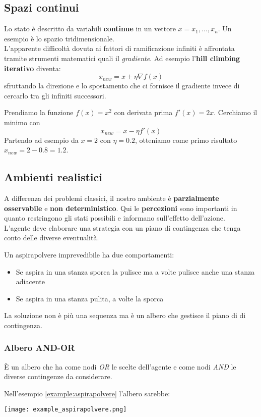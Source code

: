 \subsection{Spazi continui}
Lo stato è descritto da variabili \textbf{continue} in un vettore $x = x_1, \ldots, x_n$. Un esempio è lo spazio tridimensionale.\\
L'apparente difficoltà dovuta ai fattori di ramificazione infiniti è affrontata tramite strumenti matematici quali il \emph{gradiente}. Ad esempio l'\textbf{hill climbing iterativo} diventa:
\begin{equation*}
	x_{new} = x \pm \eta \nabla f(x)
\end{equation*}
sfruttando la direzione e lo spostamento che ci fornisce il gradiente invece di cercarlo tra gli infiniti successori.

\begin{example}
	Prendiamo la funzione $f(x)=x^2$ con derivata prima $f'(x)=2x$. Cerchiamo il minimo con
	\begin{equation*}
		x_{new}=x-\eta f'(x)
	\end{equation*}
	Partendo ad esempio da $x=2$ con $\eta=0.2$, otteniamo come primo risultato $x_{new} = 2-0.8=1.2$.
\end{example}

\subsection{Ambienti realistici}
A differenza dei problemi classici, il nostro ambiente è \textbf{parzialmente osservabile} e \textbf{non deterministico}. Qui le \textbf{percezioni} sono importanti in quanto restringono gli stati possibili e informano sull'effetto dell'azione.\\
L'agente deve elaborare una strategia con un piano di contingenza che tenga conto delle diverse eventualità.
\begin{example}[Aspirapolvere]
	\label{example:aspirapolvere}
	Un aspirapolvere imprevedibile ha due comportamenti:
	\begin{itemize}
		\item Se aspira in una stanza sporca la pulisce ma a volte pulisce anche una stanza adiacente
		\item Se aspira in una stanza pulita, a volte la sporca
	\end{itemize}
	La soluzione non è più una sequenza ma è un albero che gestisce il piano di di contingenza.
\end{example}

\subsubsection{Albero AND-OR}
È un albero che ha come nodi \emph{OR} le scelte dell'agente e come nodi \emph{AND} le diverse contingenze da considerare.
\begin{example}[Aspirapolvere]
	Nell'esempio \ref{example:aspirapolvere} l'albero sarebbe:
	\begin{center}
		\texttt{[image: example\_aspirapolvere.png]}
	\end{center}
\end{example}